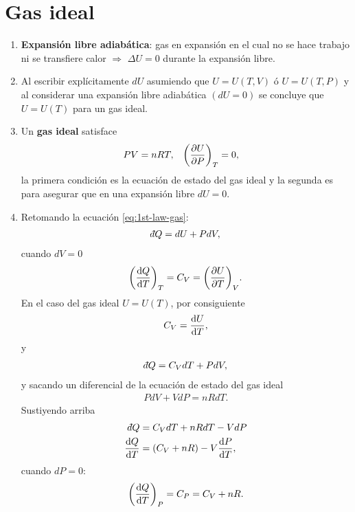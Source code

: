 \section{Gas ideal}
\begin{enumerate}
\item \textbf{Expansión libre adiabática}: gas en expansión en el 
cual no se hace trabajo ni se transfiere calor $\Rightarrow$ $\Delta U=0$
durante la expansión libre.
\item Al escribir explícitamente $dU$ asumiendo que $U=U(T,V)$ ó 
$U=U(T,P)$ y al considerar una expansión libre adiabática $(dU=0)$
se concluye que $U=U(T)$ para un gas ideal. 
\item Un \textbf{gas ideal} satisface
\begin{align}
  PV&=nRT, & \qty(\pdv{U}{P})_T&=0,
  \label{eq:ideal-gas}
\end{align}
la primera condición es la ecuación de estado del gas ideal y 
la segunda es para asegurar que en una expansión libre
$dU=0$.
\item Retomando la ecuación \eqref{eq:1st-law-gas}:
\begin{align*}
\dbar Q=dU+PdV,
\end{align*}
cuando $dV=0$
\begin{align*}
\qty(\dv{Q}{T})_T=C_V=\qty(\pdv{U}{T})_V.
\end{align*}
En el caso del gas ideal $U=U(T)$, por consiguiente
\begin{align*}
C_V=\dv{U}{T},
\end{align*}
y 
\begin{align*}
\dbar Q = C_VdT+PdV,
\end{align*}
y sacando un diferencial de la ecuación de estado del gas ideal
\begin{align*}
PdV+VdP=nRdT.
\end{align*}
Sustiyendo arriba
\begin{align*}
\dbar Q &= C_VdT + nRdT - VdP\\
\dv{Q}{T}&=\qty(C_V+nR)-V\dv{P}{T},
\end{align*}
cuando $dP=0$:
\begin{align}
  \qty(\dv{Q}{T})_P=C_P=C_V+nR.
  \label{eq:C_P-idealGas}
\end{align}
\end{enumerate}



































